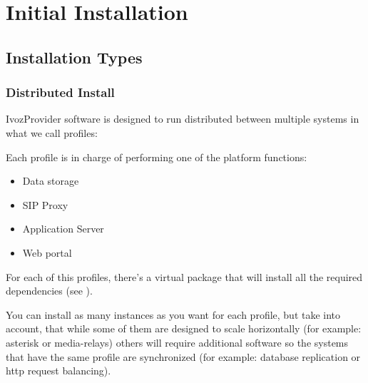 \documentclass[letterpaper,10pt,english]{sphinxmanual}
\begin{document}
\chapter{Initial Installation}
\label{basic_concepts/installation/index::doc}\label{basic_concepts/installation/index:initial-installation}

\section{Installation Types}
\label{basic_concepts/installation/install_types::doc}\label{basic_concepts/installation/install_types:installation-types}\label{basic_concepts/installation/install_types:distributed-install}

\subsection{Distributed Install}
\label{basic_concepts/installation/install_types:distributed-install}\label{basic_concepts/installation/install_types:instalacion-distribuida}\label{basic_concepts/installation/install_types:id1}
IvozProvider software is designed to run distributed between multiple systems
in what we call profiles:

Each profile is in charge of performing one of the platform functions:
\begin{itemize}
\item {} 
Data storage

\item {} 
SIP Proxy

\item {} 
Application Server

\item {} 
Web portal

\end{itemize}

For each of this profiles, there's a virtual package that will install all the
required dependencies (see {\hyperref[basic_concepts/installation/debian_install:installing\string-profile\string-package]{}}).

You can install as many instances as you want for each profile, but take into
account, that while some of them are designed to scale horizontally (for
example: asterisk or media-relays) others will require additional software so the
systems that have the same profile are synchronized (for example: database
replication or http request balancing).
\label{basic_concepts/installation/install_types:standalone-install}
\end{document}
